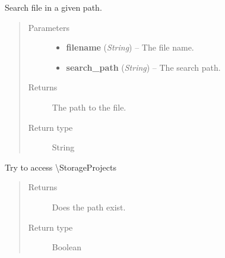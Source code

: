 \documentclass[letterpaper,10pt,english]{sphinxmanual}
\begin{document}

\begin{fulllineitems}
\label{filesystem:filesystem.search_file}
Search file in a given path.
\begin{quote}\begin{description}
\item[{Parameters}] \leavevmode\begin{itemize}
\item {} 
\textbf{filename} (\emph{String}) -- The file name.

\item {} 
\textbf{search\_path} (\emph{String}) -- The search path.

\end{itemize}

\item[{Returns}] \leavevmode
The path to the file.

\item[{Return type}] \leavevmode
String

\end{description}\end{quote}

\end{fulllineitems}


\begin{fulllineitems}
\label{filesystem:filesystem.test_storage_connection}
Try to access \textbackslash{}StorageProjects
\begin{quote}\begin{description}
\item[{Returns}] \leavevmode
Does the path exist.

\item[{Return type}] \leavevmode
Boolean

\end{description}\end{quote}

\end{fulllineitems}
\end{document}
